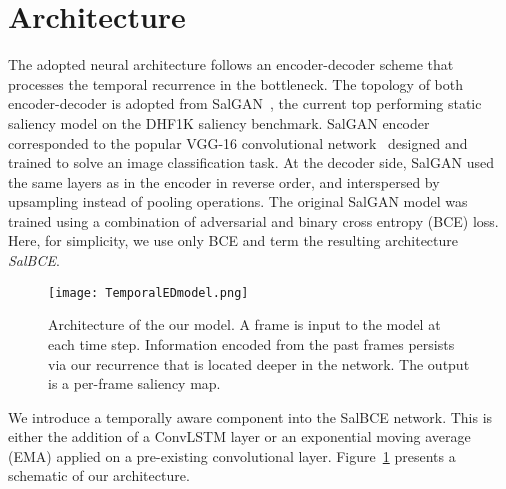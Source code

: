 \documentclass{bmvc2k}
\begin{document}
\section{Architecture}

The adopted neural architecture follows an encoder-decoder scheme that processes the temporal recurrence in the bottleneck. The topology of both encoder-decoder is adopted from SalGAN~\cite{Pan2017}, the current top performing static saliency model on the DHF1K saliency benchmark. SalGAN encoder corresponded to the popular VGG-16 convolutional network~\cite{VGG} designed and trained to solve an image classification task. At the decoder side, SalGAN used the same layers as in the encoder in reverse order, and interspersed by upsampling instead of pooling operations. The original SalGAN model was trained using a combination of adversarial and binary cross entropy (BCE) loss. Here, for simplicity, we use only BCE and term the resulting architecture \textit{SalBCE}.







\begin{figure}[t]
\begin{center}
\texttt{[image: TemporalEDmodel.png]}
\caption{Architecture of the our model. A frame is input to the model at each time step. Information encoded from the past frames persists via our recurrence that is located deeper in the network. The output is a per-frame saliency map.}
\label{fig:model_arch}
\end{center}
\end{figure}

We introduce a temporally aware component into the SalBCE network. This is either the addition of a ConvLSTM layer or an exponential moving average (EMA)  applied on a pre-existing convolutional layer. Figure~\ref{fig:model_arch} presents a schematic of our architecture.
\end{document}
